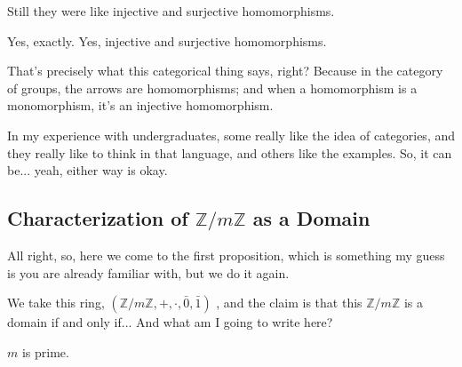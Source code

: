 \begin{student}
Still they were like injective and surjective homomorphisms.
\end{student}

\begin{speech}[00:15:02 - 00:15:33]
Yes, exactly. Yes, injective and surjective homomorphisms.

That's precisely what this categorical thing says, right? Because in the category of groups, the arrows are homomorphisms; and when a homomorphism is a monomorphism, it's an injective homomorphism.

In my experience with undergraduates, some really like the idea of categories, and they really like to think in that language, and others like the examples. So, it can be... yeah, either way is okay.
\end{speech}

\subsection{\texorpdfstring{Characterization of $\mathbb{Z}/m\mathbb{Z}$ as a Domain}{Characterization of Z/mZ as a Domain}}

\begin{speech}[00:15:33 - 00:16:03]
All right, so, here we come to the first proposition, which is something my guess is you are already familiar with, but we do it again.

We take this ring, $(\mathbb{Z} / m\mathbb{Z}, +, \cdot, \bar{0}, \bar{1})$ , and the claim is that this $\mathbb{Z} / m\mathbb{Z}$ is a domain if and only if... And what am I going to write here?
\end{speech}

\begin{student}
$m$ is prime.
\end{student}

